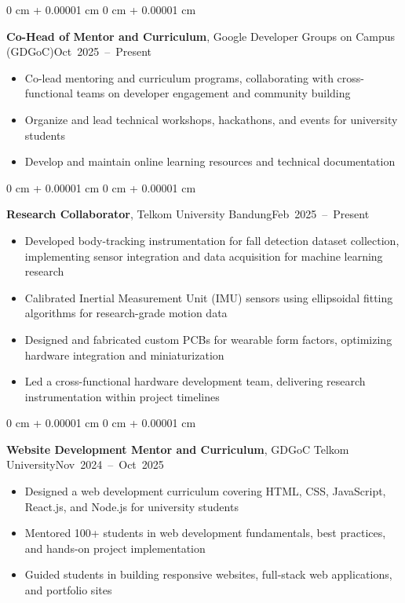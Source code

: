 \documentclass[10pt, a4paper]{article}
\newenvironment{highlights}{
    \begin{itemize}[
        topsep=0.10 cm,
        parsep=0.10 cm,
        partopsep=0pt,
        itemsep=0pt,
        leftmargin=0 cm + 10pt
    ]
}{
    \end{itemize}
} %
\newenvironment{onecolentry}{
    \begin{adjustwidth}{
        0 cm + 0.00001 cm
    }{
        0 cm + 0.00001 cm
    }
}{
    \end{adjustwidth}
} %
\newcommand{\entryheading}[2]{#1\hspace{0pt plus 1filll}\mbox{#2}\par}
\begin{document}
        \vspace{0.2 cm}

        \begin{onecolentry}
            \entryheading{\textbf{Co-Head of Mentor and Curriculum}, Google Developer Groups on Campus (GDGoC)}{Oct 2025 – Present}
            \begin{highlights}
                \item Co-lead mentoring and curriculum programs, collaborating with cross-functional teams on developer engagement and community building
                \item Organize and lead technical workshops, hackathons, and events for university students
                \item Develop and maintain online learning resources and technical documentation
            \end{highlights}
        \end{onecolentry}

        \vspace{0.2 cm}

        \begin{onecolentry}
            \entryheading{\textbf{Research Collaborator}, Telkom University Bandung}{Feb 2025 – Present}
            \begin{highlights}
                \item Developed body-tracking instrumentation for fall detection dataset collection, implementing sensor integration and data acquisition for machine learning research
                \item Calibrated Inertial Measurement Unit (IMU) sensors using ellipsoidal fitting algorithms for research-grade motion data
                \item Designed and fabricated custom PCBs for wearable form factors, optimizing hardware integration and miniaturization
                \item Led a cross-functional hardware development team, delivering research instrumentation within project timelines
            \end{highlights}
        \end{onecolentry}

        \vspace{0.2 cm}

        \begin{onecolentry}
            \entryheading{\textbf{Website Development Mentor and Curriculum}, GDGoC Telkom University}{Nov 2024 – Oct 2025}
            \begin{highlights}
                \item Designed a web development curriculum covering HTML, CSS, JavaScript, React.js, and Node.js for university students
                \item Mentored 100+ students in web development fundamentals, best practices, and hands-on project implementation
                \item Guided students in building responsive websites, full-stack web applications, and portfolio sites
            \end{highlights}
        \end{onecolentry}
\end{document}
